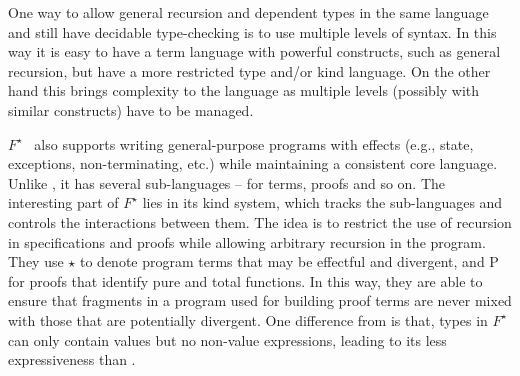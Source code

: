 One way to allow general recursion and dependent types in the same
language and still have decidable type-checking is to use multiple
levels of syntax. In this way it is easy to have a term language with 
powerful constructs, such as general recursion, but have a more
restricted type and/or kind language. On the other hand this brings 
complexity to the language as multiple levels (possibly with similar
constructs) have to be managed.


\begin{comment}
As discussed in \S\ref{sec:rec}, bringing general
recursion blindly into the dependently typed world causes more trouble
than convenience. There are many dependently typed languages that
allow general recursion. Zombie approaches general recursion by
separating a consistent sub-language, in which all expressions are
known to terminate, from a programmatic language that supports general
recursion. What is interesting about Zombie is that those two
seemingly conflicting worlds can interact with each other nicely,
without compromising the consistency property. The key idea of this is
to distinguish between these two fragments by using a
\emph{consistency classifier $\theta$}. When $\theta$ is \textsf{L},
it means the logical part, and \textsf{P} the program part. Like
\name, Zombie uses \textsf{roll} and \textsf{unroll} for iso-recursive
types. To ensure normalization (in order for decidable type checking),
it forbids the use of \textsf{unroll} in \textsf{P}, where the
potential non-termination could arise.\bruno{Zombie is being discussed
in two different places.}
\end{comment}

$F^{\star}$~\cite{Swamy2011} also supports writing general-purpose
programs with effects (e.g., state, exceptions, non-terminating, etc.)
while maintaining a consistent core language. Unlike \name, it has
several sub-languages -- for terms, proofs and so on. The interesting
part of $F^{\star}$ lies in its kind system, which tracks the
sub-languages and controls the interactions between them. The idea is
to restrict the use of recursion in specifications and proofs while
allowing arbitrary recursion in the program. They use $\star$ to
denote program terms that may be effectful and divergent, and
\textsf{P} for proofs that identify pure and total functions. In this
way, they are able to ensure that fragments in a program used for
building proof terms are never mixed with those that are potentially
divergent. One difference from \name is that, types in $F^{\star}$ can
only contain values but no non-value expressions, leading to its less
expressiveness than \name.

